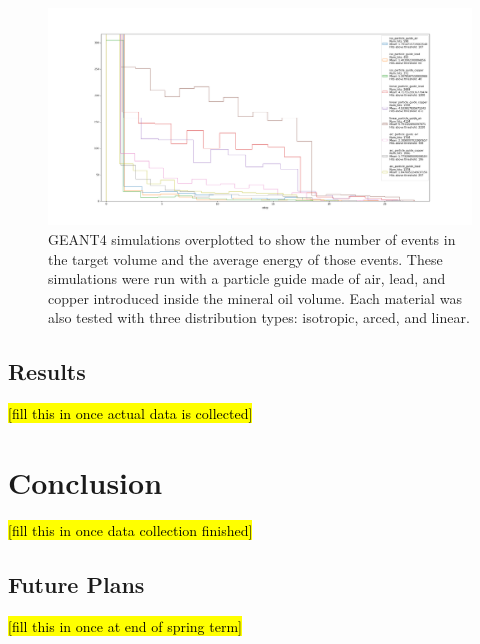 \documentclass[%
12pt,
twoside,
reprint,
amsmath,amssymb,
aps,
]{article}
\begin{document}
	\begin{figure}
		\includegraphics[scale = 0.45, center]{Images/histogramtot_particle_guide_threshold_count.png}
		\caption{\label{tab:table-name} GEANT4 simulations overplotted to show the number of events in the target volume and the average energy of those events. These simulations were run with a particle guide made of air, lead, and copper introduced inside the mineral oil volume. Each material was also tested with three distribution types: isotropic, arced, and linear.}
	\end{figure}

	\subsection{Results}
	\hl{[fill this in once actual data is collected]}
	
	\section{Conclusion}
	\hl{[fill this in once data collection finished]}
	
	\subsection{Future Plans}
	\hl{[fill this in once at end of spring term]}
	
\end{document}
